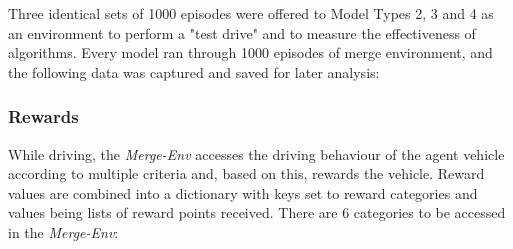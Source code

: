 Three identical sets of 1000 episodes were offered to Model Types 2, 3 and 4 as an environment to perform a "test drive" and to measure the effectiveness of algorithms. Every model ran through 1000 episodes of merge environment, and the following data was captured and saved for later analysis:

\subsubsection{Rewards}\label{sec:rewards_types}

While driving, the \emph{Merge-Env} accesses the driving behaviour of the agent vehicle according to multiple criteria and, based on this, rewards the vehicle. Reward values are combined into a dictionary with keys set to reward categories and values being lists of reward points received. There are 6 categories to be accessed in the \emph{Merge-Env}:

